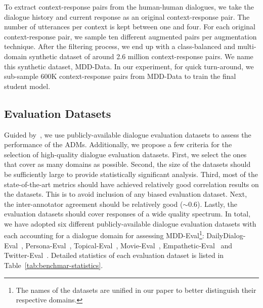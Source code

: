\documentclass[letterpaper]{article} \usepackage{aaai22}  \usepackage{times}  \usepackage{helvet}  \usepackage{courier}  \usepackage[hyphens]{url}  \usepackage{graphicx} \urlstyle{rm} \def\UrlFont{\rm}  \usepackage{natbib}  \usepackage{caption} \DeclareCaptionStyle{ruled}{labelfont=normalfont,labelsep=colon,strut=off} \frenchspacing  \setlength{\pdfpagewidth}{8.5in}  \setlength{\pdfpageheight}{11in}  \usepackage{algorithm}
\begin{document}
To extract context-response pairs from the human-human dialogues, we take the dialogue history and current response as an original context-response pair. The number of utterances per context is kept between one and four. For each original context-response pair, we sample ten different augmented pairs per augmentation technique. After the filtering process, we end up with a class-balanced and multi-domain synthetic dataset of around 2.6 million context-response pairs. We name this synthetic dataset, MDD-Data. In our experiment, for quick turn-around, we sub-sample 600K context-response pairs from MDD-Data to train the final student model. 

\subsection{Evaluation Datasets}
\label{subsec:benchmarks}
Guided by~\citep{yeh2021comprehensive}, we use publicly-available dialogue evaluation datasets to assess the performance of the ADMs. Additionally, we propose a few criteria for the selection of high-quality dialogue evaluation datasets. First, we select the ones that cover as many domains as possible. Second, the size of the datasets should be sufficiently large to provide statistically significant analysis. Third, most of the state-of-the-art metrics should have achieved relatively good correlation results on the datasets. This is to avoid inclusion of any biased evaluation dataset. Next, the inter-annotator agreement should be relatively good ($\sim$0.6). Lastly, the evaluation datasets should cover responses of a wide quality spectrum. In total, we have adopted six different publicly-available dialogue evaluation datasets with each accounting for a dialogue domain for assessing MDD-Eval\footnote{The names of the datasets are unified in our paper to better distinguish their respective domains.}: DailyDialog-Eval~\citep{zhao-etal-2020-designing},  Persona-Eval~\citep{zhao-etal-2020-designing}, Topical-Eval~\citep{mehri-eskenazi-2020-usr}, Movie-Eval~\citep{app10030762}, Empathetic-Eval~\citep{huang-etal-2020-grade} and Twitter-Eval~\citep{hori2017end}. Detailed statistics of each evaluation dataset is listed in Table~\ref{tab:benchmar-statistics}.
\end{document}
